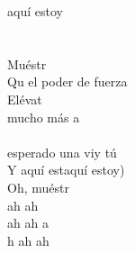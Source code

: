 \begin{cancion}
aquí estoy\\
	\jump\\
\jump\\
	Muéstr    \\
	Qu el poder de fuerza\\
	Elévat    \\
	mucho más a \\
\jump\\
	 esperado una viy tú\\
	Y aquí estaquí estoy)         \\
	Oh, muéstr   \\
	ah ah\\
	ah ah a\\
	h ah ah\\
\end{cancion}%
